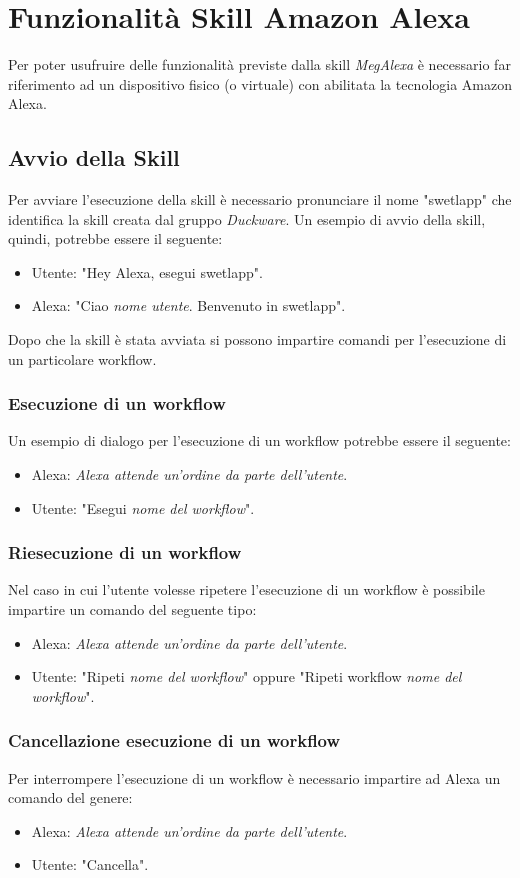 \clearpage
\section{Funzionalità Skill Amazon Alexa}
\label{sec:sec_interazione_amazon_alexa}
Per poter usufruire delle funzionalità previste dalla skill \textit{MegAlexa} è necessario far riferimento ad un dispositivo fisico (o virtuale) con abilitata la tecnologia Amazon Alexa.
\subsection{Avvio della Skill}
Per avviare l'esecuzione della skill è necessario pronunciare il nome "swetlapp" che identifica la skill creata dal gruppo \textit{Duckware}. Un esempio di avvio della skill, quindi, potrebbe essere il seguente:
\begin{itemize}
	\item Utente: "Hey Alexa, esegui swetlapp".
	\item Alexa: "Ciao \textit{nome utente}. Benvenuto in swetlapp".
\end{itemize}
Dopo che la skill è stata avviata si possono impartire comandi per l'esecuzione di un particolare workflow.
\subsubsection{Esecuzione di un workflow}
Un esempio di dialogo per l'esecuzione di un workflow potrebbe essere il seguente:
\begin{itemize}
	\item Alexa: \textit{Alexa attende un'ordine da parte dell'utente}.
	\item Utente: "Esegui \textit{nome del workflow}".
\end{itemize}
\subsubsection{Riesecuzione di un workflow}
Nel caso in cui l'utente volesse ripetere l'esecuzione di un workflow è possibile impartire un comando del seguente tipo:
\begin{itemize}
	\item Alexa: \textit{Alexa attende un'ordine da parte dell'utente}.
	\item Utente: "Ripeti \textit{nome del workflow}" oppure "Ripeti workflow \textit{nome del workflow}".
\end{itemize}
\subsubsection{Cancellazione esecuzione di un workflow}
Per interrompere l'esecuzione di un workflow è necessario impartire ad Alexa un comando del genere:
\begin{itemize}
	\item Alexa: \textit{Alexa attende un'ordine da parte dell'utente}.
	\item Utente: "Cancella".
\end{itemize}
